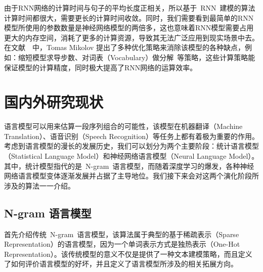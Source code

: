 由于RNN网络的计算时间与句子的平均长度正相关，所以基于~RNN~建模的算法计算时间都很大，需要更长的计算时间收敛。同时，我们需要看到最简单的RNN模型所使用的参数数量是神经网络模型的两倍多，这也意味着RNN模型需要占用更大的内存空间，消耗了更多的计算资源，导致其无法广泛应用到现实场景中去。
在文献~\cite{DBLP:conf/icassp/MikolovKBCK11}~中，Tomas Mikolov 提出了多种优化策略来消除该模型的各种缺点，例如：缩短模型求导步数、对词表（Vocabulary）做分解~等策略，这些计算策略能保证模型的计算精度，同时极大提高了RNN网络的运算效率。

\section{国内外研究现状}
语言模型可以用来估算一段序列组合的可能性，该模型在机器翻译（Machine Translation）、语音识别（Speech Recognition）等任务上都有着极为重要的作用。考虑到语言模型的漫长的发展历史，我们可以划分为两个主要阶段：统计语言模型（Statistical Language Model）和神经网络语言模型（Neural Language Model）。
其中，统计模型指代的是~N-gram~语言模型，而随着深度学习的爆发，各种神经网络语言模型变体逐渐发展并占据了主导地位。我们接下来会对这两个演化阶段所涉及的算法一一介绍。

\subsection{N-gram 语言模型}
首先介绍传统~N-gram~语言模型，该算法属于典型的基于稀疏表示（Sparse Representation）的语言模型，因为一个单词表示方式是独热表示（One-Hot Representation）。该传统模型的意义不仅是提供了一种文本建模策略，而且定义了如何评价语言模型的好坏，并且定义了语言模型所涉及的相关拓展方向。

